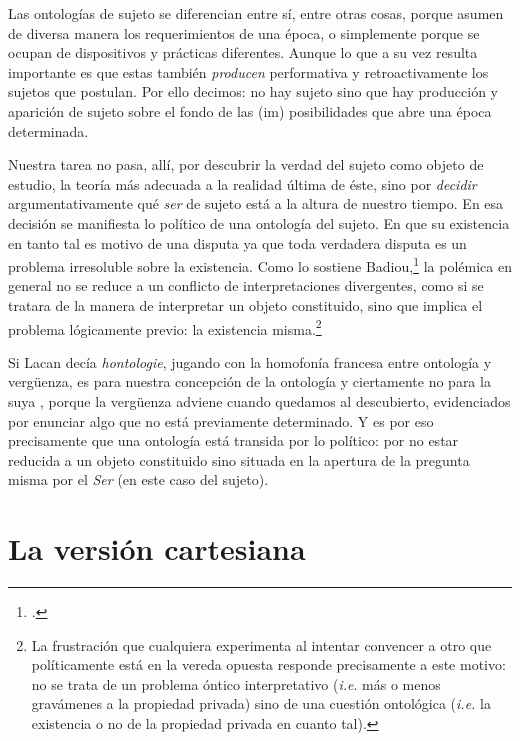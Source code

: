 Las ontologías de sujeto se diferencian entre sí, entre otras cosas, porque asumen de diversa manera los requerimientos de una época, o simplemente porque se ocupan de dispositivos y prácticas diferentes. Aunque lo que a su vez resulta importante es que estas también \emph{producen} performativa y retroactivamente los sujetos que postulan. Por ello decimos: no hay sujeto sino que hay producción y aparición de sujeto sobre el fondo de las (im) posibilidades que abre una época determinada.

Nuestra tarea no pasa, allí, por descubrir la verdad del sujeto como objeto de estudio, la teoría más adecuada a la realidad última de éste, sino por \emph{decidir} argumentativamente qué \emph{ser} de sujeto está a la altura de nuestro tiempo. En esa decisión se manifiesta lo político de una ontología del sujeto. En que su existencia en tanto tal es motivo de una disputa ya que toda verdadera disputa es un problema irresoluble sobre la existencia. Como lo sostiene Badiou,\footcite[][]{@7138-BADIOU2002} la polémica en general no se reduce a un conflicto de interpretaciones divergentes, como si se tratara de la manera de interpretar un objeto constituido, sino que implica el problema lógicamente previo: la existencia misma.\footnote{La frustración que cualquiera experimenta al intentar convencer a otro que políticamente está en la vereda opuesta responde precisamente a este motivo: no se trata de un problema óntico interpretativo (\emph{i.e}. más o menos gravámenes a la propiedad privada) sino de una cuestión ontológica (\emph{i.e.} la existencia o no de la propiedad privada en cuanto tal).}

Si Lacan decía \emph{hontologie}, jugando con la homofonía francesa entre ontología y vergüenza, es para nuestra concepción de la ontología y ciertamente no para la suya , porque la vergüenza adviene cuando quedamos al descubierto, evidenciados por enunciar algo que no está previamente determinado. Y es por eso precisamente que una ontología está transida por lo político: por no estar reducida a un objeto constituido sino situada en la apertura de la pregunta misma por el \emph{Ser} (en este caso del sujeto).

\section{La versión cartesiana}


